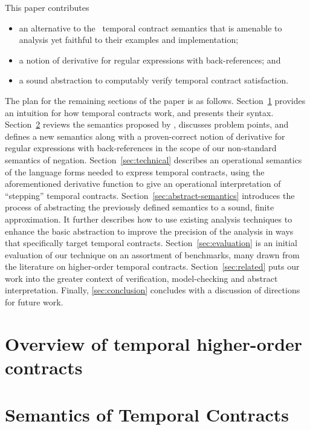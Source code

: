 This paper contributes
\begin{itemize}
 \item{an alternative to the \dfm\
    temporal contract semantics that is amenable to analysis
   yet faithful to their examples and implementation;}
 \item{a notion of derivative for regular expressions with back-references; and}
 \item{a sound abstraction to computably verify temporal contract satisfaction.}
\end{itemize}
The plan for the remaining sections of the paper is as follows.
Section~\ref{sec:overview} provides an intuition for how temporal
  contracts work, and presents their syntax.
%
Section~\ref{sec:temporal-semantics} reviews the semantics proposed by
  \dfm, discusses problem points, and defines a new semantics along
  with a proven-correct notion of derivative for regular expressions
  with back-references in the scope of our non-standard semantics of
  negation.
%
Section~\ref{sec:technical} describes an operational semantics of the
  language forms needed to express temporal contracts, using the
  aforementioned derivative function to give an operational
  interpretation of ``stepping'' temporal contracts.
%
Section~\ref{sec:abstract-semantics} introduces the process of
  abstracting the previously defined semantics to a sound, finite
  approximation.
%
  It further describes how to use existing analysis techniques to enhance the basic abstraction to improve the precision of the analysis in ways that specifically target temporal contracts.
%
Section~\ref{sec:evaluation} is an initial evaluation of our technique on an assortment of benchmarks, many drawn from the literature on higher-order temporal contracts.
%
Section~\ref{sec:related} puts our work into the greater context of verification, model-checking and abstract interpretation.
%
Finally, \autoref{sec:conclusion} concludes with a discussion of directions for future work.
%

\section{Overview of temporal higher-order contracts}\label{sec:overview}


\section{Semantics of Temporal Contracts} \label{sec:temporal-semantics}

